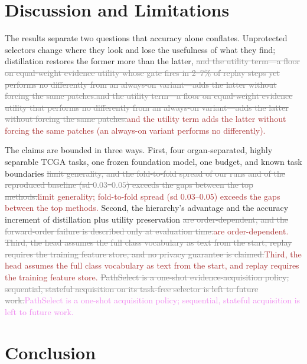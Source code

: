 \documentclass{article}
\newif\ifmarkup \markuptrue
\newcommand{\repc}[3]{\ifmarkup\textcolor{gray}{\sout{#2}}\textcolor{#1}{#3}\else#3\fi}
\newcommand{\repP}[2]{\repc{violet}{#1}{#2}}  %
\newcommand{\repB}[2]{\repc{brown}{#1}{#2}}   %
\begin{document}
\FloatBarrier
\section{Discussion and Limitations}
\label{sec:discussion}

The results separate two questions that accuracy alone conflates. Unprotected selectors change where they look and lose the usefulness of what they find; distillation restores the former more than the latter, \repP{and the utility term---a floor on equal-weight evidence utility whose gate fires in 2--7\% of replay steps yet performs no differently from an always-on variant---adds the latter without forcing the same patches.}{\repB{and the utility term---a floor on equal-weight evidence utility that performs no differently from an always-on variant---adds the latter without forcing the same patches.}{and the utility term adds the latter without forcing the same patches (an always-on variant performs no differently).}}

The claims are bounded in three ways. First, four organ-separated, highly separable TCGA tasks, one frozen foundation model, one budget, and known task boundaries \repB{limit generality, and the fold-to-fold spread of our runs and of the reproduced baseline (sd $0.03$--$0.05$) exceeds the gaps between the top methods.}{limit generality; fold-to-fold spread (sd $0.03$--$0.05$) exceeds the gaps between the top methods.} Second, the hierarchy's advantage and the accuracy increment of distillation plus utility preservation \repB{are order-dependent, and the forward-order failure is described only at evaluation time.}{are order-dependent.} \repB{Third, the head assumes the full class vocabulary as text from the start, replay requires the training feature store, and no privacy guarantee is claimed.}{Third, the head assumes the full class vocabulary as text from the start, and replay requires the training feature store.} \repP{PathSelect is a one-shot evidence-acquisition policy; sequential, stateful acquisition on its task-free selector is left to future work.}{PathSelect is a one-shot acquisition policy; sequential, stateful acquisition is left to future work.}

\section{Conclusion}
\end{document}

